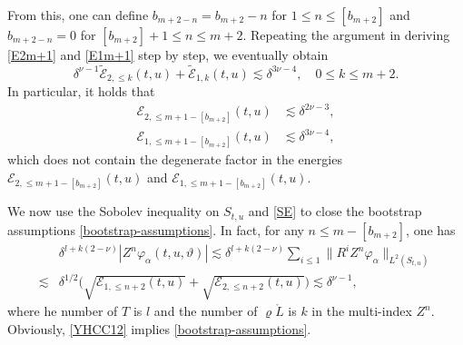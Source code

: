 \documentclass[11pt,twoside]{article}
\def\al{\alpha}
\def\vp{\varphi}
\begin{document}
From this, one can define $b_{m+2-n} = b_{m+2} - n$ for $1 \leq n \leq [b_{m+2}]$ and $b_{m+2-n} = 0$ for $[b_{m+2}] + 1 \leq n \leq m + 2$.
Repeating the argument in deriving \eqref{E2m+1} and \eqref{E1m+1} step by step, we eventually obtain
\[
\delta^{\nu-1} \widetilde{\mathcal{E}}_{2,\leq k}(t,u) + \widetilde{\mathcal{E}}_{1,k}(t,u) \lesssim \delta^{3\nu-4}, \quad 0 \leq k \leq m+2.
\]
In particular, it holds that
\begin{align}
\mathcal E_{2,\leq m + 1 - [b_{m+2}]}(t,u) &\lesssim \delta^{2\nu-3}, \label{E2low}\\
\mathcal E_{1,\leq m + 1 - [b_{m+2}]}(t,u) &\lesssim \delta^{3\nu-4},\label{E1low}
\end{align}
which does not contain the degenerate factor in the energies $\mathcal E_{2,\leq m + 1 - [b_{m+2}]}(t,u)$
and $\mathcal E_{1,\leq m + 1 - [b_{m+2}]}(t,u)$.

We now use the Sobolev inequality on $S_{t,u}$ and \eqref{SE} to close the bootstrap assumptions \eqref{bootstrap-assumptions}.
In fact, for any $n\leq m-[b_{m+2}]$, one has
\begin{equation}\label{YHCC12}
\begin{split}
&\delta^{l+k(2-\nu)}|Z^n\vp_\al(t,u,\vartheta)|
\lesssim\delta^{l+k(2-\nu)}\sum_{i\leq 1}\|R^iZ^n\vp_\al\|_{L^2(S_{t,u})}\\
\lesssim&\delta^{1/2}\bigl(\sqrt{\mathcal E_{1,\leq n+2}(t,u)}+\sqrt{\mathcal E_{2,\leq n+2}(t,u)}\bigr)\lesssim\delta^{\nu-1},
\end{split}
\end{equation}
where he number of $T$ is $l$ and the number of $\varrho\mathring L$ is $k$ in the multi-index $Z^n$.
Obviously, \eqref{YHCC12} implies \eqref{bootstrap-assumptions}.
\end{document}
